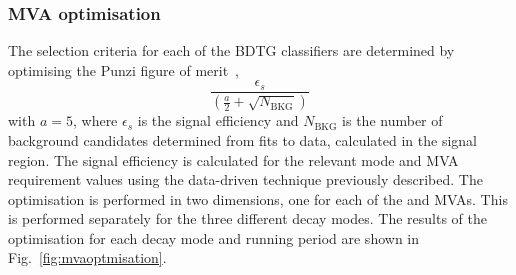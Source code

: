 \subsubsection{MVA optimisation}

The selection criteria for each of the BDTG classifiers are determined by optimising the Punzi figure of merit~\cite{Punzi:2003bu}, 
\begin{equation}
\frac{\epsilon_{s}}{(\frac{a}{2} + \sqrt{N_{\text{BKG}}})}
\end{equation}
with $a=5$, where $\epsilon_{s}$ is the signal efficiency and $N_{\text{BKG}}$ is the number of background candidates determined from fits to data, calculated in the signal region. 
The signal efficiency is calculated for the relevant mode and MVA requirement values using the data-driven technique previously described. 
The optimisation is performed in two dimensions, one for each of the \phiz and \Dsp MVAs. This is performed separately for the three different \Dsp decay modes. The results of the optimisation for each \Dsp decay mode and running period are shown in Fig.~\ref{fig:mvaoptmisation}. 

